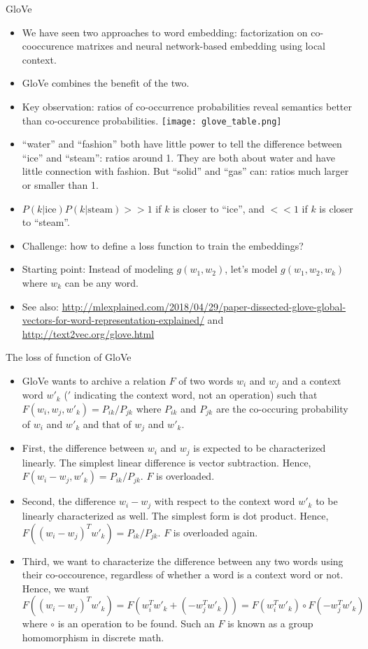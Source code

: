 \documentclass[10pt]{beamer}
\begin{document}
\begin{frame}{GloVe}
\begin{itemize}[<+->]
 \item We have seen two approaches to word embedding: factorization on co-cooccurence matrixes and neural network-based embedding using local context. 
 \item GloVe combines the benefit of the two. 
 \item Key observation: ratios of co-occurrence probabilities reveal semantics better  than co-occurence probabilities. 
 \texttt{[image: glove\_table.png]}
 \item ``water'' and ``fashion'' both have little power to tell the difference between ``ice'' and ``steam'': ratios around 1. They are both about water and have little connection with fashion. But ``solid'' and ``gas'' can: ratios much larger or smaller than 1. 
 \item $P(k|\text{ice})P(k|\text{steam}) >> 1 $ if $k$ is closer to ``ice'', and $<<1$ if $k$ is closer to ``steam''. 
 \item Challenge: how to define a loss function to train the embeddings? 
 \item Starting point: Instead of modeling $g(w_1, w_2)$, let's model $g(w_1, w_2, w_k)$ where $w_k$ can be any word. 
 \item See also: \url{http://mlexplained.com/2018/04/29/paper-dissected-glove-global-vectors-for-word-representation-explained/} and \url{http://text2vec.org/glove.html}
\end{itemize}
\end{frame}
 
\begin{frame}{The loss of function of GloVe}
\begin{itemize}[<+->]
 \item GloVe wants to archive a relation $F$ of two words $w_i$ and $w_j$ and a context word $w'_k$ ($'$ indicating the context word, not an operation) such that $F(w_i, w_j, w'_k) = P_{ik} / P_{jk}$ where $P_{ik}$ and $P_{jk}$ are the co-occuring probability of $w_i$ and $w'_k$ and that of $w_j$ and $w'_k$. 
 \item First, the difference between $w_i$ and $w_j$ is expected to be characterized linearly. The simplest linear difference is vector subtraction.  Hence, 
   $F(  w_i-w_j, w'_k) = P_{ik} / P_{jk}$. $F$ is overloaded. 
 \item Second, the difference $w_i-w_j$ with respect to the context word $w'_k$ to be linearly characterized as well. The simplest form is dot product. Hence, $F(  (w_i-w_j)^T w'_k) = P_{ik} / P_{jk}$. $F$ is overloaded again. 
 \item Third, we want to characterize the difference between any two words using their co-occourence, regardless of whether a word is a context word or not. Hence, we want $F((w_i-w_j)^T w'_k) = F(w_i^T w'_k + (-w_j^Tw'_k)) = F(w_i^T w'_k) \circ F(-w_j^T w'_k)$ where $\circ$ is an operation to be found. Such an $F$ is known as a group homomorphism in discrete math.
\end{itemize}
\end{frame}
\end{document}
